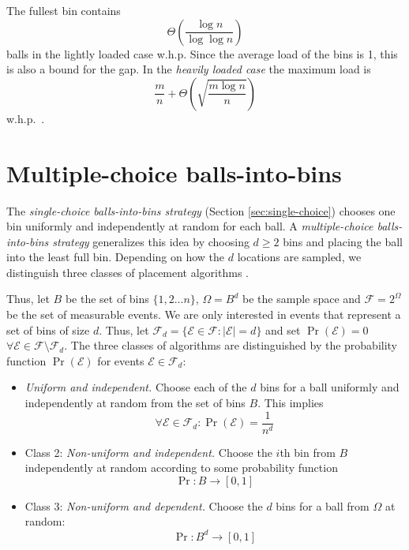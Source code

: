 \documentclass[a4paper,12pt]{article}
\newcommand\todo[1]{\textcolor{red}{(#1)}}
\begin{document}
The fullest bin contains
\[
\Theta \left( \frac{\log n}{\log \log n} \right)
\] 
balls in the lightly loaded case w.h.p. Since the average load of the bins is 1, this is also a bound for the gap. 
In the \emph{heavily loaded case} the maximum load is 
\[
\frac{m}{n} + \Theta\left(\sqrt{\frac{m \log n}{n}}\right)
\] 
w.h.p.~\cite{RS98}.

\section{Multiple-choice balls-into-bins}
\label{sec:multiple-choice}
The \emph{single-choice balls-into-bins strategy} (Section \ref{sec:single-choice}) chooses one bin uniformly and independently at random for each ball. A \emph{multiple-choice balls-into-bins strategy} generalizes this idea by  choosing $d \geq 2$ bins and placing the ball into the least full bin. Depending on how the $d$ locations are sampled, we distinguish three classes of placement algorithms \cite{VOC03}. 

Thus, let $B$ be the set of bins $\{1,2...n\}$, $\Omega = B^{d}$ be the sample space and $\mathcal{F} = 2^{\Omega}$ be the set of measurable events. We are only interested in events that represent a set of bins of size $d$. Thus, let $\mathcal{F}_d = \{\mathcal{E} \in \mathcal{F}: \left\vert \mathcal{E} \right\vert = d\}$ and set $\Pr\left(\mathcal{E}  \right) = 0$  $\forall \mathcal{E} \in \mathcal{F} \setminus \mathcal{F}_d $. The three classes of algorithms are distinguished by the probability function $\Pr\left(\mathcal{E}\right)$ for events $\mathcal{E} \in \mathcal{F}_d$:
\begin{itemize}
\item  \emph{Uniform and independent.} Choose each of the $d$ bins for a ball uniformly and independently at random from the set of bins $B$. This implies 
\[
\forall \mathcal{E} \in \mathcal{F}_d: \Pr\left(\mathcal{E}\right) = \frac{1}{n ^{d}}
\]
\item Class 2: \emph{Non-uniform and independent.} Choose the $i$th bin from $B$ independently at random according to some probability function
\[
\Pr: B \rightarrow \left[0,1\right]
\]

\item Class 3: \emph{Non-uniform and dependent.} Choose the $d$ bins for a ball from $\Omega$ at random:
\[
\Pr: B^{d} \rightarrow \left[0,1\right]
\]

\end{itemize} 
 
\end{document}
